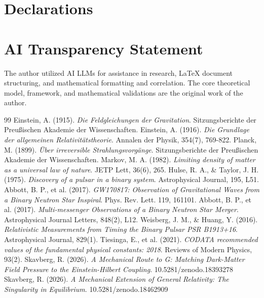 \documentclass{article}
\begin{document}
\section*{Declarations}
\section*{AI Transparency Statement}
The author utilized AI LLMs for assistance in research, LaTeX document structuring, and mathematical formatting and correlation. The core theoretical model, framework, and mathematical validations are the original work of the author.

\begin{thebibliography}{99}
 Einstein, A. (1915). \textit{Die Feldgleichungen der Gravitation}. Sitzungsberichte der Preu{\ss}ischen Akademie der Wissenschaften.
 Einstein, A. (1916). \textit{Die Grundlage der allgemeinen Relativit{\"a}tstheorie}. Annalen der Physik, 354(7), 769-822.
 Planck, M. (1899). \textit{{\"U}ber irreversible Strahlungsvorg{\"a}nge}. Sitzungsberichte der Preu{\ss}ischen Akademie der Wissenschaften.
 Markov, M. A. (1982). \textit{Limiting density of matter as a universal law of nature}. JETP Lett, 36(6), 265.
 Hulse, R. A., \& Taylor, J. H. (1975). \textit{Discovery of a pulsar in a binary system}. Astrophysical Journal, 195, L51.
 Abbott, B. P., et al. (2017). \textit{GW170817: Observation of Gravitational Waves from a Binary Neutron Star Inspiral}. Phys. Rev. Lett. 119, 161101.
 Abbott, B. P., et al. (2017). \textit{Multi-messenger Observations of a Binary Neutron Star Merger}. Astrophysical Journal Letters, 848(2), L12.
 Weisberg, J. M., \& Huang, Y. (2016). \textit{Relativistic Measurements from Timing the Binary Pulsar PSR B1913+16}. Astrophysical Journal, 829(1).
 Tiesinga, E., et al. (2021). \textit{CODATA recommended values of the fundamental physical constants: 2018}. Reviews of Modern Physics, 93(2).
 Skavberg, R. (2026). \textit{A Mechanical Route to G: Matching Dark-Matter Field Pressure to the Einstein-Hilbert Coupling}. 10.5281/zenodo.18393278
 Skavberg, R. (2026). \textit{A Mechanical Extension of General Relativity: The Singularity in Equilibrium}. 10.5281/zenodo.18462909
\end{thebibliography}
\end{document}
